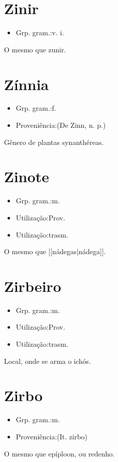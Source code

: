 \section{Zinir}
\begin{itemize}
\item {Grp. gram.:v. i.}
\end{itemize}
O mesmo que \textunderscore zunir\textunderscore .
\section{Zínnia}
\begin{itemize}
\item {Grp. gram.:f.}
\end{itemize}
\begin{itemize}
\item {Proveniência:(De \textunderscore Zinn\textunderscore , n. p.)}
\end{itemize}
Gênero de plantas synanthéreas.
\section{Zinote}
\begin{itemize}
\item {Grp. gram.:m.}
\end{itemize}
\begin{itemize}
\item {Utilização:Prov.}
\end{itemize}
\begin{itemize}
\item {Utilização:trasm.}
\end{itemize}
O mesmo que [[nádegas|nádega]].
\section{Zirbeiro}
\begin{itemize}
\item {Grp. gram.:m.}
\end{itemize}
\begin{itemize}
\item {Utilização:Prov.}
\end{itemize}
\begin{itemize}
\item {Utilização:trasm.}
\end{itemize}
Local, onde se arma o ichós.
\section{Zirbo}
\begin{itemize}
\item {Grp. gram.:m.}
\end{itemize}
\begin{itemize}
\item {Proveniência:(It. \textunderscore zirbo\textunderscore )}
\end{itemize}
O mesmo que \textunderscore epíploon\textunderscore , ou \textunderscore redenho\textunderscore .
